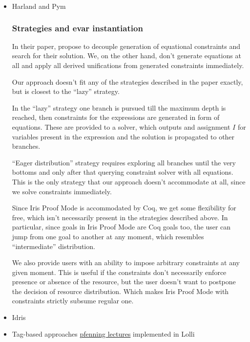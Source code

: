 \begin{itemize}
\item Harland and Pym

\subsubsection{Strategies and evar instantiation}
\label{subsubsec:strategies_and_evars}

In their paper, \citet{harlandResourceDistributionBooleanConstraints2003} propose to decouple generation of equational constraints and search for their solution.
We, on the other hand, don't generate equations at all and apply all derived unifications from generated constraints immediately.

Our approach doesn't fit any of the strategies described in the paper exactly, but is closest to the ``lazy'' strategy.

In the ``lazy'' strategy one branch is pursued till the maximum depth is reached, then constraints for the expressions are generated in form of equations.
These are provided to a solver, which outputs and assignment \(I\) for variables present in the expression and the solution is propagated to other branches.

``Eager distribution'' strategy requires exploring all branches until the very bottoms and only after that querying constraint solver with all equations.
This is the only strategy that our approach doesn't accommodate at all, since we solve constraints immediately.

Since Iris Proof Mode is accommodated by Coq, we get some flexibility for free, which isn't necessarily present in the strategies described above.
In particular, since goals in Iris Proof Mode are Coq goals too, the user can jump from one goal to another at any moment, which resembles ``intermediate'' distribution.

We also provide users with an ability to impose arbitrary constraints at any given moment.
This is useful if the constraints don't necessarily enforce presence or absence of the resource, but the user doesn't want to postpone the decision of resource distribution.
Which makes Iris Proof Mode with constraints strictly subsume regular one.
  
\item Idris \cite{MultiplicitiesIdris2Documentation}

\item Tag-based approaches \citet{hodasTagFrameSystemResource2002} \citet{lopezImplementingEfficientResource2004}
  \href{http://www-cgi.cs.cmu.edu/afs/cs/user/fp/www/courses/lp/lectures/15-resources.pdf}{pfenning lectures}
  implemented in Lolli \cite{LolliLinearLogic}
\end{itemize}

